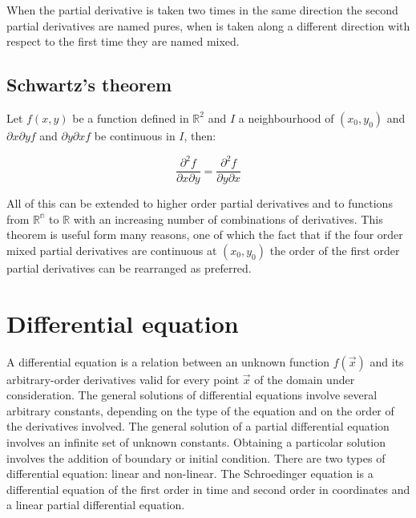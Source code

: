 When the partial derivative is taken two times in the same direction the second partial derivatives are named pures, when is taken along a different direction with respect to the first time they are named mixed.

	\subsection{Schwartz's theorem}
	Let $f(x, y)$ be a function defined in $\mathbb{R}^2$ and $I$ a neighbourhood of $(x_0, y_0)$ and $\partial x\partial y f$ and $\partial y\partial x f$ be continuous in $I$, then:

	$$\frac{\partial^2 f}{\partial x\partial y} = \frac{\partial ^2 f}{\partial y\partial x}$$

	All of this can be extended to higher order partial derivatives and to functions from $\mathbb{R^n}$ to $\mathbb{R}$ with an increasing number of combinations of derivatives.
	This theorem is useful form many reasons, one of which the fact that if the four order mixed partial derivatives are continuous at $(x_0, y_0)$ the order of the first order partial derivatives can be rearranged as preferred.

\section{Differential equation}
A differential equation is a relation between an unknown function $f(\vec{x})$ and its arbitrary-order derivatives valid for every point $\vec{x}$ of the domain under consideration.
The general solutions of differential equations involve several arbitrary constants, depending on the type of the equation and on the order of the derivatives involved.
The general solution of a partial differential equation involves an infinite set of unknown constants.
Obtaining a particolar solution involves the addition of boundary or initial condition.
There are two types of differential equation: linear and non-linear.
The Schroedinger equation is a differential equation of the first order in time and second order in coordinates and a linear partial differential equation.
